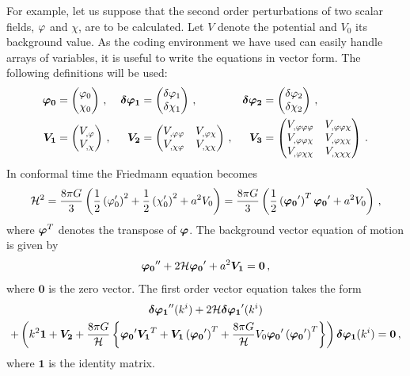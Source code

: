 For example, let us suppose that the second order perturbations of two scalar fields,
$\varphi$ and $\chi$, are to
be calculated. Let $V$ denote the potential and $V_0$ its background value. As the
coding environment we have used can easily handle arrays of variables, it is useful
to write the equations in vector form. The following definitions will be used:
% 
\begin{align}
\label{eq:vector-defns-res}
 \bm{\vp_0} &= \begin{pmatrix}
                \vp_0 \\
		\chi_0
               \end{pmatrix} \,, &
% 
 \bm{\dvp1} &= \begin{pmatrix}
                \dvp1 \\
		\delta\chi_1
               \end{pmatrix} \,, &
% 
 \bm{\dvp2} &= \begin{pmatrix}
                \dvp2 \\
		\delta\chi_2
               \end{pmatrix} \,, \\
% 
 \bm{V_1} &= \begin{pmatrix}
             \Uphi \\
	     V_{,\chi} 
            \end{pmatrix} \,, &
% 
 \bm{V_2} &= \begin{pmatrix}
             \Upp & V_{,\vp\chi} \\
	     V_{,\chi\vp} & V_{,\chi\chi}
            \end{pmatrix} \,, &
% 
\bm{V_3} &= \begin{pmatrix}
            \Uppp & V_{,\vp\vp\chi} \\
	    V_{,\vp\vp\chi} & V_{,\vp\chi\chi} \\
	    V_{,\vp\chi\chi} & V_{,\chi\chi\chi}
           \end{pmatrix} \,.
\end{align}
% 
In conformal time the Friedmann equation becomes
% 
\begin{equation}
 \H^2 = \frac{8\pi G}{3} \left( \frac{1}{2}\left(\vp_0'\right)^2 
        + \frac{1}{2}\left(\chi_0'\right)^2 + a^2 \U \right) 
% 
= \frac{8\pi G}{3}\left( \frac{1}{2} \left( \bm{\vp_0}' \right)^{T} \bm{\vp_0}' + a^2 \U \right) \,,
\end{equation}
% 
where $\boldsymbol{\varphi}^{T}$ denotes the transpose of $\boldsymbol{\varphi}$.
% 
The background vector equation of motion is given by
% 
\begin{equation}
 \boldsymbol{\varphi_0}'' + 2\mathcal{H} \boldsymbol{\varphi_0}' + a^2 \boldsymbol{V_1} = \boldsymbol{0}\,,
\end{equation}
% 
where $\bm{0}$ is the zero vector.
The first order vector equation takes the form
% 
\begin{multline}
 \boldsymbol{\delta\varphi_{1}}''(k^i) + 2\mathcal{H} \boldsymbol{\delta\varphi_{1}}'(k^i) \\
 + \left( k^2 \boldsymbol{1}  + \boldsymbol{V_2} 
 + \frac{8\pi G}{\mathcal{H}}\left\{ 
  \boldsymbol{\varphi_0}' \boldsymbol{V_1}^{T} + \boldsymbol{V_1}\left(\boldsymbol{\varphi_0}'\right)^T
  + \frac{8\pi G}{\mathcal{H}}V_{0} \boldsymbol{\varphi_0}' \left(\boldsymbol{\varphi_0}'\right)^T
\right\}
\right)\boldsymbol{\delta\varphi_{1}}(k^i) = \boldsymbol{0}\,,
\end{multline}
% 
where $\bm{1}$ is the identity matrix.


